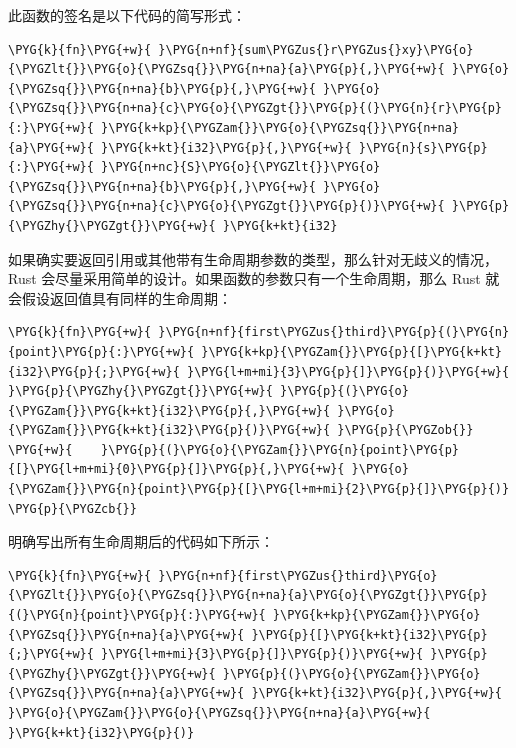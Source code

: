 此函数的签名是以下代码的简写形式：

\begin{Verbatim}[commandchars=\\\{\},breaklines=true,breakanywhere=true,fontsize=\codefont,xleftmargin=17bp]
\PYG{k}{fn}\PYG{+w}{ }\PYG{n+nf}{sum\PYGZus{}r\PYGZus{}xy}\PYG{o}{\PYGZlt{}}\PYG{o}{\PYGZsq{}}\PYG{n+na}{a}\PYG{p}{,}\PYG{+w}{ }\PYG{o}{\PYGZsq{}}\PYG{n+na}{b}\PYG{p}{,}\PYG{+w}{ }\PYG{o}{\PYGZsq{}}\PYG{n+na}{c}\PYG{o}{\PYGZgt{}}\PYG{p}{(}\PYG{n}{r}\PYG{p}{:}\PYG{+w}{ }\PYG{k+kp}{\PYGZam{}}\PYG{o}{\PYGZsq{}}\PYG{n+na}{a}\PYG{+w}{ }\PYG{k+kt}{i32}\PYG{p}{,}\PYG{+w}{ }\PYG{n}{s}\PYG{p}{:}\PYG{+w}{ }\PYG{n+nc}{S}\PYG{o}{\PYGZlt{}}\PYG{o}{\PYGZsq{}}\PYG{n+na}{b}\PYG{p}{,}\PYG{+w}{ }\PYG{o}{\PYGZsq{}}\PYG{n+na}{c}\PYG{o}{\PYGZgt{}}\PYG{p}{)}\PYG{+w}{ }\PYG{p}{\PYGZhy{}\PYGZgt{}}\PYG{+w}{ }\PYG{k+kt}{i32}
\end{Verbatim}

如果确实要返回引用或其他带有生命周期参数的类型，那么针对无歧义的情况，Rust 会尽量采用简单的设计。如果函数的参数只有一个生命周期，那么 Rust 就会假设返回值具有同样的生命周期：

\begin{Verbatim}[commandchars=\\\{\},breaklines=true,breakanywhere=true,fontsize=\codefont,xleftmargin=17bp]
\PYG{k}{fn}\PYG{+w}{ }\PYG{n+nf}{first\PYGZus{}third}\PYG{p}{(}\PYG{n}{point}\PYG{p}{:}\PYG{+w}{ }\PYG{k+kp}{\PYGZam{}}\PYG{p}{[}\PYG{k+kt}{i32}\PYG{p}{;}\PYG{+w}{ }\PYG{l+m+mi}{3}\PYG{p}{]}\PYG{p}{)}\PYG{+w}{ }\PYG{p}{\PYGZhy{}\PYGZgt{}}\PYG{+w}{ }\PYG{p}{(}\PYG{o}{\PYGZam{}}\PYG{k+kt}{i32}\PYG{p}{,}\PYG{+w}{ }\PYG{o}{\PYGZam{}}\PYG{k+kt}{i32}\PYG{p}{)}\PYG{+w}{ }\PYG{p}{\PYGZob{}}
\PYG{+w}{    }\PYG{p}{(}\PYG{o}{\PYGZam{}}\PYG{n}{point}\PYG{p}{[}\PYG{l+m+mi}{0}\PYG{p}{]}\PYG{p}{,}\PYG{+w}{ }\PYG{o}{\PYGZam{}}\PYG{n}{point}\PYG{p}{[}\PYG{l+m+mi}{2}\PYG{p}{]}\PYG{p}{)}
\PYG{p}{\PYGZcb{}}
\end{Verbatim}

明确写出所有生命周期后的代码如下所示：

\begin{Verbatim}[commandchars=\\\{\},breaklines=true,breakanywhere=true,fontsize=\codefont,xleftmargin=17bp]
\PYG{k}{fn}\PYG{+w}{ }\PYG{n+nf}{first\PYGZus{}third}\PYG{o}{\PYGZlt{}}\PYG{o}{\PYGZsq{}}\PYG{n+na}{a}\PYG{o}{\PYGZgt{}}\PYG{p}{(}\PYG{n}{point}\PYG{p}{:}\PYG{+w}{ }\PYG{k+kp}{\PYGZam{}}\PYG{o}{\PYGZsq{}}\PYG{n+na}{a}\PYG{+w}{ }\PYG{p}{[}\PYG{k+kt}{i32}\PYG{p}{;}\PYG{+w}{ }\PYG{l+m+mi}{3}\PYG{p}{]}\PYG{p}{)}\PYG{+w}{ }\PYG{p}{\PYGZhy{}\PYGZgt{}}\PYG{+w}{ }\PYG{p}{(}\PYG{o}{\PYGZam{}}\PYG{o}{\PYGZsq{}}\PYG{n+na}{a}\PYG{+w}{ }\PYG{k+kt}{i32}\PYG{p}{,}\PYG{+w}{ }\PYG{o}{\PYGZam{}}\PYG{o}{\PYGZsq{}}\PYG{n+na}{a}\PYG{+w}{ }\PYG{k+kt}{i32}\PYG{p}{)}
\end{Verbatim}

